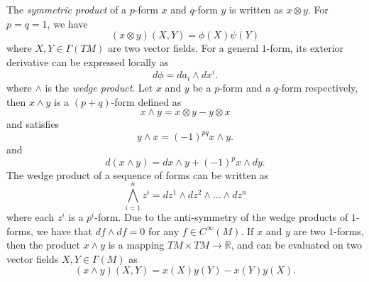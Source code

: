 The \textit{symmetric product} of a $p$-form $x$ and $q$-form $y$ is written as $x \otimes y$. For $p=q=1$, we have
\begin{equation}
(x \otimes y)(X, Y) = \phi(X) \psi(Y)
\end{equation} 
where $X, Y \in \Gamma(TM)$ are two vector fields. For a general $1$-form, its exterior derivative can be expressed locally as
\begin{equation} \label{eq:exterior derivative of 1-form}
d\phi = d a_i \wedge dx^i.
\end{equation}
where $\wedge$ is the \textit{wedge product}. Let $x$ and $y$ be a $p$-form
and a $q$-form respectively, then $x \wedge y$ is a $(p+q)$-form defined as
\begin{equation}
x \wedge y = x \otimes y - y \otimes x
\end{equation}
and satisfies
\begin{equation}
y\wedge x=(-1)^{pq}x\wedge y.
\end{equation}
and
\begin{equation} \label{eq:exterior derivative of wedge product}
d(x \wedge y) = dx \wedge y + (-1)^p x \wedge d y.
\end{equation}
The wedge product of a sequence of forms can be written as
\begin{equation}
\bigwedge_{i=1}^n z^i = dz^1 \wedge dz^2 \wedge \dots \wedge dz^n
\end{equation}
where each $z^i$ is a $p^i$-form. Due to the anti-symmetry of the wedge products of $1$-forms, we have
that $df \wedge df = 0$ for any $f \in C^\infty(M)$. If $x$ and $y$ are two $1$-forms, then the product $x \wedge y$ is a mapping $TM \times TM \to \mathbb{R}$, and can be evaluated on two vector fields $X,Y \in \Gamma(M)$ as
\begin{equation}
(x \wedge y)(X, Y) = x(X) y(Y) - x(Y) y(X).
\end{equation}

